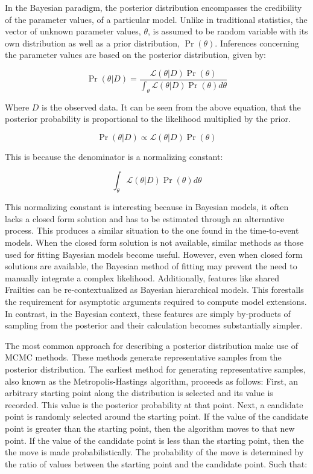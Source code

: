 In the Bayesian paradigm, the posterior distribution encompasses the credibility of the parameter values, of a particular model. Unlike in traditional statistics, the vector of unknown parameter values, $\theta$, is assumed to be random variable with its own distribution as well as a prior distribution, $\Pr(\theta)$\cite{Ibrahim2005}. Inferences concerning the parameter values are based on the posterior distribution, given by:

$$ \Pr(\theta|D) = \frac{\mathcal {L}(\theta|D)\Pr(\theta)}{\int_\theta\mathcal {L}(\theta|D)\Pr(\theta) d\theta} $$

Where $D$ is the observed data. It can be seen from the above equation, that the posterior probability is proportional to the likelihood multiplied by the prior. 

$$ \Pr(\theta|D) \propto  \mathcal {L}(\theta|D)\Pr(\theta) $$

This is because the denominator is a normalizing constant: 

$$ \int_\theta\mathcal {L}(\theta|D)\Pr(\theta) d\theta $$

This normalizing constant is interesting because in Bayesian models, it often lacks a closed form solution and has to be estimated through an alternative process. This produces a similar situation to the one found in the time-to-event models. When the closed form solution is not available, similar methods as those used for fitting Bayesian models become useful. However, even when closed form solutions are available, the Bayesian method of fitting may prevent the need to manually integrate a complex likelihood. Additionally, features like shared Frailties can be re-contextualized as Bayesian hierarchical models. This forestalls the requirement for asymptotic arguments required to compute model extensions. In contrast, in the Bayesian context, these features are simply by-products of sampling from the posterior and their calculation becomes substantially simpler\cite{Ibrahim2005}. 

The most common approach for describing a posterior distribution make use of MCMC methods. These methods generate representative samples from the posterior distribution. The earliest method for generating representative samples, also known as the Metropolis-Hastings algorithm\cite{Metropolis1953}, proceeds as follows: First, an arbitrary starting point along the distribution is selected and its value is recorded. This value is the posterior probability at that point. Next, a candidate point is randomly selected around the starting point. If the value of the candidate point is greater than the starting point, then the algorithm moves to that new point. If the value of the candidate point is less than the starting point, then the the move is made probabilistically. The probability of the move is determined by the ratio of values between the starting point and the candidate point. Such that:

